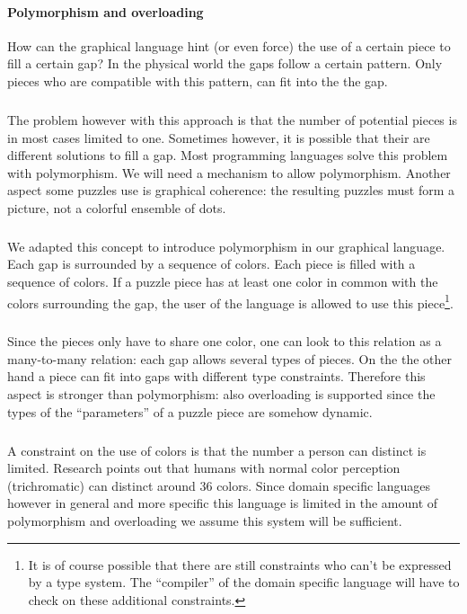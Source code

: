 \paragraph{Polymorphism and overloading}
How can the graphical language hint (or even force) the use of a certain piece
to fill a certain gap? In the physical world the gaps follow a certain pattern.
Only pieces who are compatible with this pattern, can fit into the the gap.
\subparagraph{}
The problem however with this approach is that the number of potential pieces
is in most cases limited to one. Sometimes however, it is possible that their
are different solutions to fill a gap. Most programming languages solve this
problem with polymorphism. We will need a mechanism to allow polymorphism.
Another aspect some puzzles use is graphical coherence: the resulting puzzles
must form a picture, not a colorful ensemble of dots.
\subparagraph{}
We adapted this concept to introduce polymorphism in our graphical language.
Each gap is surrounded by a sequence of colors. Each piece is filled with a
sequence of colors. If a puzzle piece has at least one color in common with the
colors surrounding the gap, the user of the language is allowed to use this
piece\footnote{It is of course possible that there are still constraints who
can't be expressed by a type system. The ``compiler'' of the domain specific
language will have to check on these additional constraints.}.
\subparagraph{}
Since the pieces only have to share one color, one can look to this relation as
a many-to-many relation: each gap allows several types of pieces. On the the
other hand a piece can fit into gaps with different type constraints. Therefore
this aspect is stronger than polymorphism: also overloading is supported since
the types of the ``parameters'' of a puzzle piece are somehow dynamic.
\subparagraph{}
A constraint on the use of colors is that the number a person can distinct is
limited. Research points out that humans with normal color perception
(trichromatic) can distinct around 36 colors. Since domain specific languages
however in general and more specific this language is limited in the amount of
polymorphism and overloading we assume this system will be sufficient.
